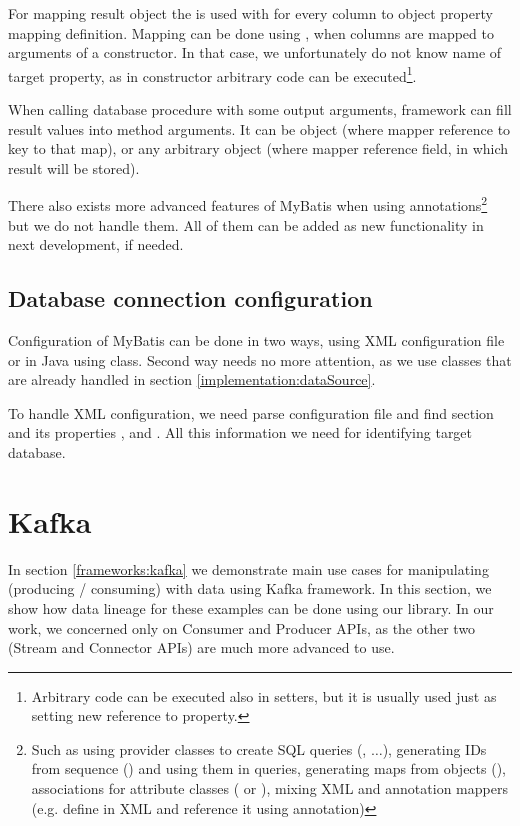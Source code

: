 For mapping result object the  is used with 
for every column to object property mapping definition.
Mapping can be done using , when columns are mapped
to arguments of a constructor. In that case, we unfortunately do not know
name of target property, as in constructor arbitrary code can be executed\footnote{
  Arbitrary code can be executed also in setters, but it is usually used
  just as setting new reference to property.
}.

When calling database procedure with some output arguments,
framework can fill result values into method arguments.
It can be  object (where mapper reference to key to that map),
or any arbitrary object (where mapper reference field, in which result will be stored).

There also exists more advanced features of MyBatis when using annotations\footnote{
  Such as using provider classes to create SQL queries (, $\ldots$),
  generating IDs from sequence () and using them in queries,
  generating maps from objects (),
  associations for attribute classes ( or ),
  mixing XML and annotation mappers (e.g. define  in XML and reference it
  using  annotation)}
but we do not handle them. All of them can be added as new functionality in next development,
if needed.




\subsection{Database connection configuration}

Configuration of MyBatis can be done in two ways, using XML configuration file
or in Java using  class. Second way needs no more attention,
as we use  classes that are already handled in section \ref{implementation:dataSource}.

To handle XML configuration, we need parse configuration file and find 
section and its properties ,  and . All this
information we need for identifying target database.




\section{Kafka}

In section \ref{frameworks:kafka} we demonstrate main use cases
for manipulating (producing / consuming) with data using Kafka framework.
In this section, we show how data lineage for these examples can be done
using our library. In our work, we concerned only on Consumer and Producer APIs,
as the other two (Stream and Connector APIs) are much more advanced to use.



